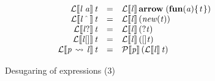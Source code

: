 \documentclass[acmsmall,screen]{acmart}\settopmatter{}
\newcommand{\Varid}[1]{\mathit{#1}}
\newcommand{\Ld}[2]{{\mathcal L}\llbracket #1 \rrbracket \, #2}
\newcommand{\Pd}[2]{{\mathcal P}\llbracket #1 \rrbracket \, #2}
\newcommand{\Ld}[2]{#1 : #2}
\newcommand{\Pd}[2]{#1 := #2}
\newenvironment{figurebox}{\begin{figure}\begin{framed}}{\end{framed}\end{figure}}
\begin{document}
\begin{figurebox}
$$\begin{array}{rclll}
  \ensuremath{\Ld{ \Varid{l}\;\Varid{a}}{ \Varid{t}}} & = & \ensuremath{\Ld{ \Varid{l}}{ \textbf{arrow}\;(\textbf{fun}(\Varid{a})\{\mskip1.5mu \Varid{t}\mskip1.5mu\})}} \\
  \ensuremath{\Ld{ \Varid{l} \hat{\hspace{0.8em}}}{ \Varid{t}}} & = & \ensuremath{\Ld{ \Varid{l}}{ (\Varid{new} (\Varid{t}))}} \\
  \ensuremath{\Ld{ \Varid{l}\mathbin{?}}{ \Varid{t}}} & = & \ensuremath{\Ld{ \Varid{l}}{ (\mathbin{?}\Varid{t})}} \\
  \ensuremath{\Ld{ \Varid{l} []}{ \Varid{t}}} & = & \ensuremath{\Ld{ \Varid{l}}{ ([] \Varid{t})}} \\
  \ensuremath{\Ld{ \Varid{p}\;\!\leadsto\!\;\Varid{l}}{ \Varid{t}}} & = & \ensuremath{\Pd{ \Varid{p}}{ (\Ld{ \Varid{l}}{ \Varid{t}})}} \\
\end{array}
$$
\caption{Desugaring of expressions (3)} \label{fig:desugar-expr}
\end{figurebox}
\end{document}
